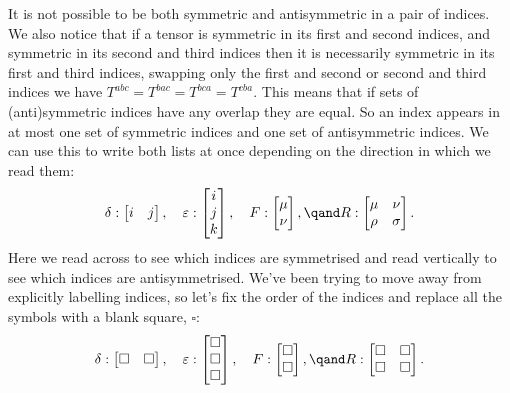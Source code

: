 \documentclass[fleqn]{NotesClass}
\begin{document}
    It is not possible to be both symmetric and antisymmetric in a pair of indices.
    We also notice that if a tensor is symmetric in its first and second indices, and symmetric in its second and third indices then it is necessarily symmetric in its first and third indices, swapping only the first and second or second and third indices we have \(T^{abc} = T^{bac} = T^{bca} = T^{cba}\).
    This means that if sets of (anti)symmetric indices have any overlap they are equal.
    So an index appears in at most one set of symmetric indices and one set of antisymmetric indices.
    We can use this to write both lists at once depending on the direction in which we read them:
    \begin{equation}
        \delta: 
        \begin{bmatrix}
            i & j
        \end{bmatrix}
        , \quad \varepsilon: 
        \begin{bmatrix}
            i\\
            j\\
            k
        \end{bmatrix}
        , \quad F:
        \begin{bmatrix}
            \mu\\
            \nu
        \end{bmatrix}
        , \qand R: 
        \begin{bmatrix}
            \mu & \nu\\
            \rho & \sigma
        \end{bmatrix}
        .
    \end{equation}
    Here we read across to see which indices are symmetrised and read vertically to see which indices are antisymmetrised.
    We've been trying to move away from explicitly labelling indices, so let's fix the order of the indices and replace all the symbols with a blank square, \(\square\):
    \begin{equation}
        \delta: 
        \begin{bmatrix}
            \square & \square
        \end{bmatrix}
        , \quad \varepsilon: 
        \begin{bmatrix}
            \square\\
            \square\\
            \square
        \end{bmatrix}
        , \quad F:
        \begin{bmatrix}
            \square\\
            \square
        \end{bmatrix}
        , \qand R: 
        \begin{bmatrix}
            \square & \square\\
            \square & \square
        \end{bmatrix}
        .
    \end{equation}
\end{document}
